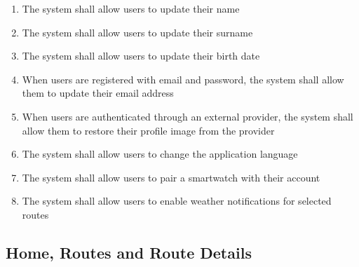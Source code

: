 \begin{enumerate}[label=\textbf{FR\arabic*}, ref=FR\arabic*]
\item \label{fr-smartphone:update-name}
The system shall allow users to update their name

\item \label{fr-smartphone:update-surname}
The system shall allow users to update their surname

\item \label{fr-smartphone:update-birthdate}
The system shall allow users to update their birth date

\item \label{fr-smartphone:update-email}
When users are registered with email and password, the system shall allow them to update their email address

\item \label{fr-smartphone:restore-image}
When users are authenticated through an external provider, the system shall allow them to restore their profile image from the provider

\item \label{fr-smartphone:change-language}
The system shall allow users to change the application language

\item \label{fr-smartphone:pair-watch}
The system shall allow users to pair a smartwatch with their account

\item \label{fr-smartphone:weather-notifications}
The system shall allow users to enable weather notifications for selected routes

\end{enumerate}


\newpage
\subsection{Home, Routes and Route Details}

